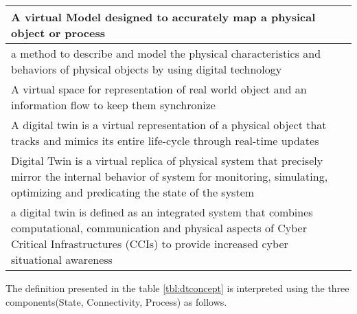 \begin{table}[H]
\begin{NiceTabular}{p{10cm}|p{4cm}}
    
    \hline
    A virtual Model designed to accurately map a physical object or process & \cite{wangDTCPNDigitalTwin2022, sousaELEGANTSecurityCritical2021} \\
    
    \hline
    a method to describe and model the physical characteristics and behaviors of physical objects by using digital technology & \cite{wangSoCbasedDigitalTwin2020} \\
    
    \hline
    A virtual space for representation of real world object and an information flow to keep them synchronize  & \cite{giovannipaolosellittoEnablingZeroTrust2021}\\
    
    \hline
    A digital twin is a virtual representation of a physical object that tracks and mimics its entire life-cycle through real-time updates & \cite{vargheseDigitalTwinbasedIntrusion2022, dietzUnleashingDigitalTwin2020} \\
    
    \hline
    Digital Twin is a virtual replica of physical system that precisely mirror the internal behavior of system for monitoring, simulating, optimizing and predicating the state of the system & \cite{akbarianSecurityFrameworkDigital2021, akbarianIntrusionDetectionDigital2020} \\
    
    \hline
    a digital twin is defined as an integrated system that combines computational, communication and physical aspects of Cyber Critical Infrastructures (CCIs) to provide increased cyber situational awareness & \cite{salviCyberresilienceCriticalCyber2022, pirbhulalNovelFrameworkReinforcing2022} \\
\bottomrule
\end{NiceTabular}
\end{table}

The definition presented in the table  \ref{tbl:dtconcept} is interpreted using the three components(State, Connectivity, Process) as follows.  

